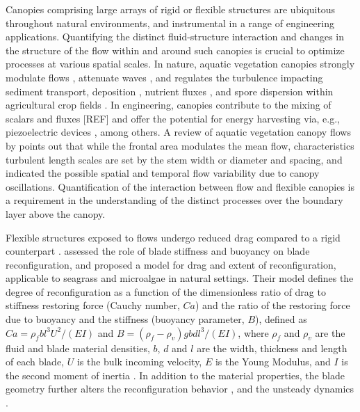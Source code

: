 \documentclass[lineno,authoryear]{FLO_v1}%
\theoremstyle{definition}
\begin{document}
Canopies comprising large arrays of rigid or flexible structures are ubiquitous throughout natural environments, and instrumental in a range of engineering applications. Quantifying the distinct fluid-structure interaction and changes in the structure of the flow within and around such canopies is crucial to optimize processes at various spatial scales. In nature, aquatic vegetation canopies  strongly modulate flows \citep{gambi1990flume,chen2013flow}, attenuate waves \citep{fonseca1992preliminary,paul2012wave}, and regulates the turbulence impacting sediment transport, deposition \citep{lefebvre2010influence,ortiz2013mean}, nutrient fluxes \citep{mcglathery2007eutrophication, lawson2012enhancement}, and spore dispersion within agricultural crop fields \citep{mccartney1994dispersal}. In engineering, canopies contribute to the mixing of scalars and fluxes [REF] and offer the potential for energy harvesting via, e.g., piezoelectric devices \citep{bae2014flutter}, among others.
A review of aquatic vegetation canopy flows by \citet{nepf2012flow} points out that while the frontal area modulates the mean flow, characteristics turbulent length scales are set by the stem width or diameter and spacing, and indicated the possible spatial and temporal flow variability due to canopy oscillations. Quantification of the interaction between flow and flexible canopies is a requirement in the understanding of the distinct processes over the boundary layer above the canopy. 


Flexible structures exposed to flows undergo reduced drag compared to a rigid counterpart \citep{vogel1984drag, gosselin2010drag}.  \cite{luhar2011flow} assessed the role of blade stiffness and buoyancy on blade reconfiguration, and proposed a model for drag and extent of reconfiguration, applicable to seagrass and microalgae in natural settings. Their model defines the degree of reconfiguration as a function of the dimensionless ratio of drag to stiffness restoring force (Cauchy number, $Ca$) and the ratio of the restoring force due to buoyancy and the stiffness (buoyancy parameter, $B$), defined as $Ca=\rho_f bl^{3}U^{2}/(EI)$ and $B= (\rho_f - \rho_v) gbdl^{3}/(EI)$, where  $\rho_{f}$ and $\rho_{v}$ are the fluid and blade material densities,  $b$, $d$ and $l$ are the width, thickness and length of each blade,  $U$  is the bulk incoming velocity, $E$ is the Young Modulus, and  $I$  is the second moment of inertia \citep{luhar2016wave}. In addition to the material properties, the blade geometry further alters the reconfiguration behavior \citep{albayrak2012flow}, and the unsteady dynamics \citep{jin2018flow}.
\end{document}
